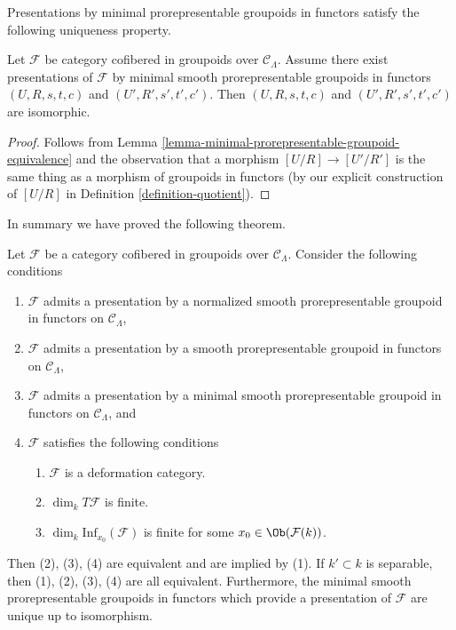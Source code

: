 \noindent
Presentations by minimal prorepresentable groupoids in functors satisfy the
following uniqueness property.

\begin{lemma}
\label{lemma-minimal-presentations-equivalent}
Let $\mathcal{F}$ be category cofibered in groupoids over
$\mathcal{C}_\Lambda$. Assume there exist presentations of
$\mathcal{F}$ by minimal smooth prorepresentable groupoids
in functors $(U, R, s, t, c)$ and $(U', R', s', t', c')$.
Then $(U, R, s, t, c)$ and $(U', R', s', t', c')$ are isomorphic.
\end{lemma}

\begin{proof}
Follows from
Lemma \ref{lemma-minimal-prorepresentable-groupoid-equivalence}
and the observation that a morphism
$[U/R] \to [U'/R']$ is the same thing as a morphism
of groupoids in functors (by our explicit construction of $[U/R]$ in
Definition \ref{definition-quotient}).
\end{proof}

\noindent
In summary we have proved the following theorem.

\begin{theorem}
\label{theorem-minimal-smooth-prorepresentable-presentations}
Let $\mathcal{F}$ be a category cofibered in groupoids over
$\mathcal{C}_\Lambda$. Consider the following conditions
\begin{enumerate}
\item $\mathcal{F}$ admits a presentation by a normalized
smooth prorepresentable groupoid in functors on $\mathcal{C}_\Lambda$,
\item $\mathcal{F}$ admits a presentation by a
smooth prorepresentable groupoid in functors on $\mathcal{C}_\Lambda$,
\item $\mathcal{F}$ admits a presentation by a minimal
smooth prorepresentable groupoid in functors on $\mathcal{C}_\Lambda$, and
\item $\mathcal{F}$ satisfies the following conditions
\begin{enumerate}
\item $\mathcal{F}$ is a deformation category.
\item $\dim_k T\mathcal{F}$ is finite.
\item $\dim_k \text{Inf}_{x_0}(\mathcal{F})$ is finite for some
$x_0 \in \Ob(\mathcal{F}(k))$.
\end{enumerate}
\end{enumerate}
Then (2), (3), (4) are equivalent and are implied by (1).
If $k' \subset k$ is separable, then (1), (2), (3), (4) are all equivalent.
Furthermore, the minimal smooth prorepresentable groupoids in functors
which provide a presentation of $\mathcal{F}$ are unique up to isomorphism.
\end{theorem}

